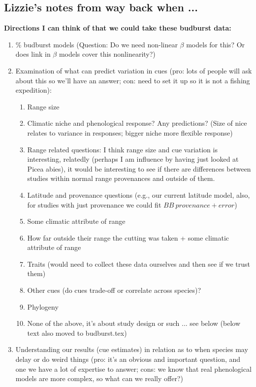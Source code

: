 \documentclass[11pt,letterpaper]{article}
\begin{document}
\subsection{Lizzie's notes from way back when ...}

{\bf Directions I can think of that we could take these budburst data:}
\begin{enumerate}
\item \% budburst models (Question: Do we need non-linear $\beta$ models for this? Or does link in $\beta$ models cover this nonlinearity?)
\item Examination of what can predict variation in cues (pro: lots of people will ask about this so we'll have an answer; con: need to set it up so it is not a fishing expedition):
\begin{enumerate}
\item Range size
\item Climatic niche and phenological response? Any predictions? (Size of nice relates to variance in responses; bigger niche more flexible response)
\item Range related questions: I think range size and cue variation is interesting, relatedly (perhaps I am influence by having just looked at Picea abies), it would be interesting to see if there are differences between studies within normal range provenances and outside of them.
\item Latitude and provenance questions (e.g., our current latitude model, also, for studies with just provenance we could fit $BB~provenance+error$)
\item Some climatic attribute of range
\item How far outside their range the cutting was taken + some climatic attribute of range
\item Traits (would need to collect these data ourselves and then see if we trust them)
\item Other cues (do cues trade-off or correlate across species)?
\item Phylogeny
\item None of the above, it's about study design or such ... see below (below text also moved to budburst.tex) %
\end{enumerate}
\item Understanding our results (cue estimates) in relation as to when species may delay or do weird things (pro: it's an obvious and important question, and one we have a lot of expertise to answer; cons: we know that real phenological models are more complex, so what can we really offer?) 

\end{enumerate}
\end{document}
